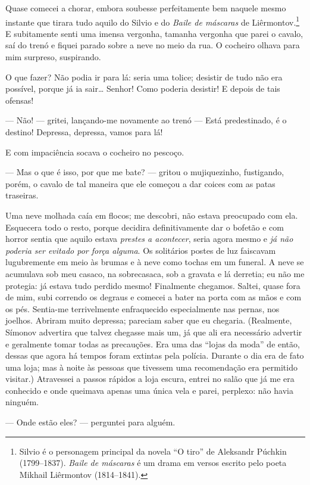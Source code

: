Quase comecei a chorar, embora soubesse perfeitamente bem naquele mesmo
instante que tirara tudo aquilo do Silvio e do \textit{Baile de máscaras} de
Liêrmontov.\footnote{ Silvio é o personagem principal da novela “O tiro” de
Aleksandr Púchkin (1799--1837). \textit{Baile de máscaras} é um drama em versos
escrito pelo poeta Mikhail Liêrmontov (1814--1841).} E subitamente senti uma
imensa vergonha, tamanha vergonha que parei o cavalo, saí do trenó e fiquei
parado sobre a neve no meio da rua. O cocheiro olhava para mim surpreso,
suspirando.

O que fazer? Não podia ir para lá: seria uma tolice; desistir de tudo não era
possível, porque já ia sair\ldots{} Senhor! Como poderia desistir! E depois de
tais ofensas!

--- Não! --- gritei, lançando-me novamente ao trenó --- Está predestinado, é o
destino! Depressa, depressa, vamos para lá!

E com impaciência socava o cocheiro no pescoço.

--- Mas o que é isso, por que me bate? --- gritou o mujiquezinho, fustigando,
porém, o cavalo de tal maneira que ele começou a dar coices com as patas
traseiras.

Uma neve molhada caía em flocos; me descobri, não estava preocupado com ela.
Esquecera todo o resto, porque decidira definitivamente dar o bofetão e com
horror sentia que aquilo estava \textit{prestes a acontecer}, seria agora mesmo
e \textit{já não poderia ser evitado por força alguma}. Os solitários postes de
luz faiscavam lugubremente em meio às brumas e à neve como tochas em um
funeral. A neve se acumulava sob meu casaco, na sobrecasaca, sob a gravata e lá
derretia; eu não me protegia: já estava tudo perdido mesmo! Finalmente
chegamos. Saltei, quase fora de mim, subi correndo os degraus e comecei a bater
na porta com as mãos e com os pés. Sentia-me terrivelmente enfraquecido
especialmente nas pernas, nos joelhos.  Abriram muito depressa; pareciam saber
que eu chegaria. (Realmente, Símonov advertira que talvez chegasse mais um, já
que ali era necessário advertir e geralmente tomar todas as precauções. Era uma
das “lojas da moda” de então, dessas que agora há tempos foram extintas pela
polícia. Durante o dia era de fato uma loja; mas à noite às pessoas que
tivessem uma recomendação era permitido visitar.) Atravessei a passos rápidos a
loja escura, entrei no salão que já me era conhecido e onde queimava apenas uma
única vela e parei, perplexo: não havia ninguém.

--- Onde estão eles? --- perguntei para alguém.

